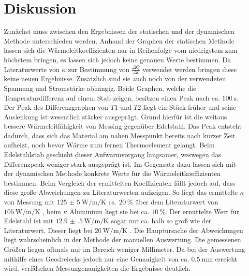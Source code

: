 
\section{Diskussion}
\label{sec:Diskussion}
Zunächst muss zwischen den Ergebnissen der statischen und der dynamischen Methode
 unterschieden werden. Anhand der Graphen der statischen Methode lassen sich
 die Wärmeleitkoeffizienten nur in Reihenfolge vom niedrigstem zum höchstem bringen,
 es lassen sich jedoch keine genauen Werte bestimmen. Da Literaturwerte
 von $\kappa$ zur Bestimmung von $\frac{\Delta Q}{\Delta t}$ verwendet werden
 bringen diese keine neuen Ergebnisse. Zusätzlich sind sie auch noch von der
 verwendeten Spannung und Stromstärke abhängig. Beide Graphen, welche die
 Temperaturdifferenz auf einem Stab zeigen, besitzen einen Peak nach
 ca. $\SI{100}{\second}$. Der Peak des Differenzgraphen von $T1$ und $T2$ 
liegt ein Stück früher und seine Auslenkung ist wesentlich stärker ausgeprägt. Grund hierfür ist die  weitaus bessere
 Wärmeleitfähigkeit von Messing gegenüber Edelstahl. Das Peak entsteht dadurch, dass sich das
 Material am nahen Messpunkt bereits nach kurzer Zeit aufheizt, noch bevor Wärme zum fernen Thermoelement gelangt. Beim Edelstahlstab geschieht
 dieser Aufwärmvorgang langsamer, weswegen das Differenzpeak weniger stark ausgeprägt ist. Im
 Gegensatz dazu lassen sich mit der dynamischen Methode konkrete Werte für die
 Wärmeleitkoeffizienten bestimmen. Beim Vergleich der ermittelten Koeffizienten
  fällt jedoch auf, dass diese große Abweichungen zu Literaturwerten \cite{km} aufzeigen.
  So liegt das ermittelte $\kappa$ von Messung mit
  $\SI{125(5)}{\watt\per\meter\per\kelvin}$ ca. $\SI{20}{\percent}$ über
  dem Literaturwert von $\SI{105}{\watt\per\meter\per\kelvin}$ \cite{km}, beim $\kappa$
  Aluminium liegt sie bei ca. $\SI{10}{\percent}$. Der ermittelte Wert für
  Edelstahl ist mit $\SI{12.9(5)}{\watt\per\meter\per\kelvin}$ sogar
   nur ca. halb so groß wie der Literaturwert. Dieser liegt bei $\SI{20}{\watt\per\meter\per\kelvin}$ \cite{km}.
   Die Hauptursache der Abweichungen liegt wahrscheinlich in der Methode der manuellen
   Auswertung. Die gemessenen Größen liegen oftmals nur im Bereich weniger Millimeter.
   Da bei der Auswertung mithilfe eines Geodreiecks jedoch nur eine
   Genauigkeit von ca. $\SI{0.5}{\milli\meter}$ erreicht wird, verfälschen
   Messungenauigkeiten die Ergebnisse deutlich.
